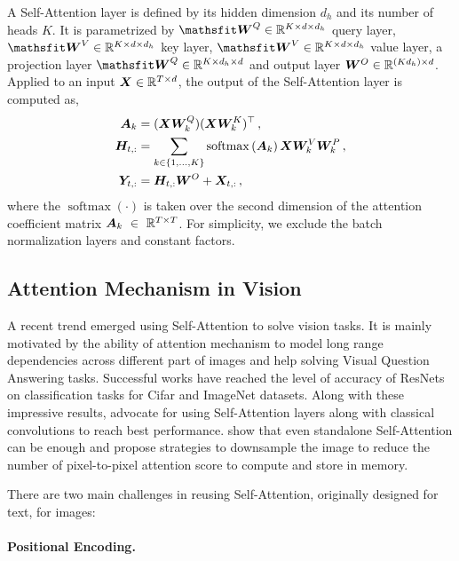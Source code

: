 \documentclass{article} %
\begin{document}
A Self-Attention layer is defined by its hidden dimension $d_{h}$ and its number of heads $K$.  %
It is parametrized by
$\tW^Q \in \R^{K \times d \times d_{h}}$ query layer, $\tW^V \in \R^{K \times d \times d_{h}}$ key layer, $\tW^V \in \R^{K \times d \times d_{h}}$ value layer, a projection layer $\tW^Q \in \R^{K \times d_{h} \times d}$ and output layer ${\bm{W}}^O \in \mathbb{R}^{(Kd_{h})\times d}$. 
%
Applied to an input ${\bm{X}} \in \mathbb{R}^{T\times d}$, the output of the Self-Attention layer is computed as,
%
\begin{align}
  {\bm{A}}_k &= 
    ({\bm{X}} {\bm{W}}_k^Q)({\bm{X}} {\bm{W}}_k^K)^\top
  \,, \label{eq:att_coeff}\\
  {\bm{H}}_{t,:} &= 
  \sum_{k \in \{1,\dots, K\}} 
  \operatorname{softmax}
  \left(
    {\bm{A}}_k
  \right)
  {\bm{X}}
  {\bm{W}}_k^V
  {\bm{W}}_k^P
  \,,\\
  {\bm{Y}}_{t,:} &= {\bm{H}}_{t,:} {\bm{W}}^O + {\bm{X}}_{t,:}\,,
  \label{eq:attention}
\end{align}
where the $\operatorname{softmax}(\cdot)$ is taken over the second dimension of the attention coefficient matrix ${\bm{A}}_k~\in~\mathbb{R}^{T\times T}$. For simplicity, we exclude the batch normalization layers and constant factors.%
%


\subsection{Attention Mechanism in Vision}

A recent trend emerged using Self-Attention to solve vision tasks.
%
It is mainly motivated by the ability of attention mechanism to model long range dependencies across different part of images and help solving Visual Question Answering tasks. 
% 
Successful works have reached the level of accuracy of ResNets on classification tasks for Cifar and ImageNet datasets. 
%
Along with these impressive results, \cite{belloAttentionAugmentedConvolutional2019} advocate for using Self-Attention layers along with classical convolutions to reach best performance.
%
\cite{ramachandran2019standaloneselfattention} show that even standalone Self-Attention can be enough and propose strategies to downsample the image to reduce the number of pixel-to-pixel attention score to compute and store in memory.


There are two main challenges in reusing Self-Attention, originally designed for text, for images:
\paragraph{Positional Encoding.}
%
\end{document}
